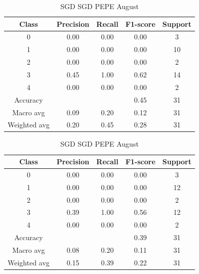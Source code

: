 \begin{enumerate}
\begin{enumerate}
                \begin{table}[H]
                \centering
                \scriptsize
                \begin{minipage}{0.48\textwidth}
                \centering
                \begin{tabular}{c|cccc}
                \hline
                Class & Precision & Recall & F1-score & Support \\
                \hline
                0 & 0.00 & 0.00 & 0.00 & 3 \\
                1 & 0.00 & 0.00 & 0.00 & 10 \\
                2 & 0.00 & 0.00 & 0.00 & 2 \\
                3 & 0.45 & 1.00 & 0.62 & 14 \\
                4 & 0.00 & 0.00 & 0.00 & 2 \\
                \hline
                Accuracy &       &      & 0.45 & 31 \\
                Macro avg & 0.09 & 0.20 & 0.12 & 31 \\
                Weighted avg & 0.20 & 0.45 & 0.28 & 31 \\
                \hline
                \end{tabular}
                \caption{SGD SGD DOGE August}
                \label{tab:classifier_2_report_sgd_sgd_doge_non_filtered_aug}
                \end{minipage}%
                \hfill
                \begin{minipage}{0.48\textwidth}
                \centering
                \begin{tabular}{c|cccc}
                \hline
                Class & Precision & Recall & F1-score & Support \\
                \hline
                0 & 0.00 & 0.00 & 0.00 & 3 \\
                1 & 0.00 & 0.00 & 0.00 & 12 \\
                2 & 0.00 & 0.00 & 0.00 & 2 \\
                3 & 0.39 & 1.00 & 0.56 & 12 \\
                4 & 0.00 & 0.00 & 0.00 & 2 \\
                \hline
                Accuracy &       &      & 0.39 & 31 \\
                Macro avg & 0.08 & 0.20 & 0.11 & 31 \\
                Weighted avg & 0.15 & 0.39 & 0.22 & 31 \\
                \hline
                \end{tabular}
                \caption{SGD SGD PEPE August}
                \label{tab:classifier_2_report_sgd_sgd_pepe_non_filtered_aug}
                \end{minipage}
                

\end{table}
\end{enumerate}
\end{enumerate}
